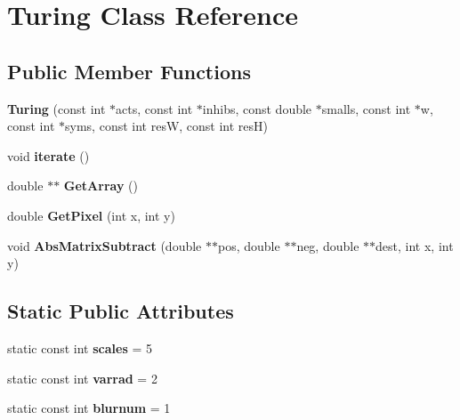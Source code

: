 \hypertarget{class_turing}{\section{Turing Class Reference}
\label{class_turing}
}
\subsection*{Public Member Functions}
\begin{DoxyCompactItemize}
\item 
\hypertarget{class_turing_a3cad41d7b0d6091a6c884392b1a7ef0e}{{\bfseries Turing} (const int $\ast$acts, const int $\ast$inhibs, const double $\ast$smalls, const int $\ast$w, const int $\ast$syms, const int res\+W, const int res\+H)}\label{class_turing_a3cad41d7b0d6091a6c884392b1a7ef0e}

\item 
\hypertarget{class_turing_a2457d5fc7995a59591277feb4638c065}{void {\bfseries iterate} ()}\label{class_turing_a2457d5fc7995a59591277feb4638c065}

\item 
\hypertarget{class_turing_a07e8488de30f7cfad5a2adb0854877cc}{double $\ast$$\ast$ {\bfseries Get\+Array} ()}\label{class_turing_a07e8488de30f7cfad5a2adb0854877cc}

\item 
\hypertarget{class_turing_a36851de65c0bb0645f055dbcdaf18137}{double {\bfseries Get\+Pixel} (int x, int y)}\label{class_turing_a36851de65c0bb0645f055dbcdaf18137}

\item 
\hypertarget{class_turing_a1ba8305fcdadbddeab2e3da05e15f1be}{void {\bfseries Abs\+Matrix\+Subtract} (double $\ast$$\ast$pos, double $\ast$$\ast$neg, double $\ast$$\ast$dest, int x, int y)}\label{class_turing_a1ba8305fcdadbddeab2e3da05e15f1be}

\end{DoxyCompactItemize}
\subsection*{Static Public Attributes}
\begin{DoxyCompactItemize}
\item 
\hypertarget{class_turing_a7839ff6ada90a2003ec77427a40395e5}{static const int {\bfseries scales} = 5}\label{class_turing_a7839ff6ada90a2003ec77427a40395e5}

\item 
\hypertarget{class_turing_a9122bbf71c58f54167f1ad1b8919b0fb}{static const int {\bfseries varrad} = 2}\label{class_turing_a9122bbf71c58f54167f1ad1b8919b0fb}

\item 
\hypertarget{class_turing_a5c3a33960f324d21686e2fad8dd347fe}{static const int {\bfseries blurnum} = 1}\label{class_turing_a5c3a33960f324d21686e2fad8dd347fe}

\end{DoxyCompactItemize}
